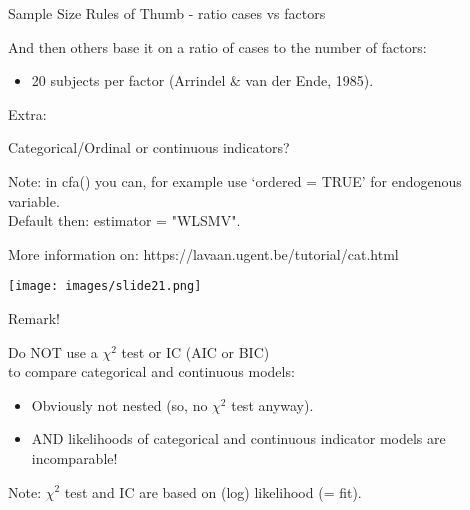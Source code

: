 \documentclass[10pt]{beamer}\usepackage[]{graphicx}\usepackage[]{xcolor}
\begin{document}
%
\begin{frame}{Sample Size Rules of Thumb - ratio cases vs factors}
	
And then others base it on a ratio of cases to the number of factors:
~\\

\begin{itemize}
\item 20 subjects per factor (Arrindel \& van der Ende, 1985).
\end{itemize}

\end{frame}


\begin{frame}
	
	\begin{center}
		\Huge{Extra:}
		
		\large{Categorical/Ordinal or continuous indicators?}
	\end{center}
	
	\vspace*{15mm}
	
	Note: in cfa() you can, for example use `ordered = TRUE' for  endogenous variable.\\
	Default then: estimator = "WLSMV".
	
	\vspace*{15mm}
	
	More information on: https://lavaan.ugent.be/tutorial/cat.html
	
\end{frame}

\begin{frame}
	
	\texttt{[image: images/slide21.png]}
	
\end{frame}


\begin{frame}{Remark!}
	
Do NOT use a $\chi^2$ test or IC (AIC or BIC) \\
to compare categorical and continuous models:

\vspace{5mm}

\begin{itemize}
	\item Obviously not nested (so, no $\chi^2$ test anyway).
	\item AND likelihoods of categorical and continuous indicator models are incomparable!
\end{itemize}
	
	\vspace{5mm}
	
	Note: $\chi^2$ test and IC are based on (log) likelihood (= fit).
	
\end{frame}
\end{document}
